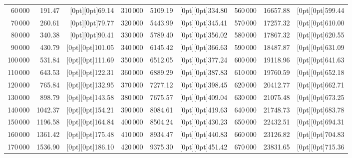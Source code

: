 {{\begin{tabular}{|r|r|r||r|r|r||r|r|r|}
\cline{1-2}\cline{4-5}\cline{7-8}
60\,000 & 191.47 & \raisebox{-6.7pt}[0pt][0pt]{69.14} & 310\,000 & 5109.19 & \raisebox{-6.7pt}[0pt][0pt]{334.80} & 560\,000 & 16657.88 & \raisebox{-6.7pt}[0pt][0pt]{599.44} \\
70\,000 & 260.61 & \raisebox{-6.7pt}[0pt][0pt]{79.77} & 320\,000 & 5443.99 & \raisebox{-6.7pt}[0pt][0pt]{345.41} & 570\,000 & 17257.32 & \raisebox{-6.7pt}[0pt][0pt]{610.00} \\
80\,000 & 340.38 & \raisebox{-6.7pt}[0pt][0pt]{90.41} & 330\,000 & 5789.40 & \raisebox{-6.7pt}[0pt][0pt]{356.02} & 580\,000 & 17867.32 & \raisebox{-6.7pt}[0pt][0pt]{620.55} \\
90\,000 & 430.79 & \raisebox{-6.7pt}[0pt][0pt]{101.05} & 340\,000 & 6145.42 & \raisebox{-6.7pt}[0pt][0pt]{366.63} & 590\,000 & 18487.87 & \raisebox{-6.7pt}[0pt][0pt]{631.09} \\
100\,000 & 531.84 & \raisebox{-6.7pt}[0pt][0pt]{111.69} & 350\,000 & 6512.05 & \raisebox{-6.7pt}[0pt][0pt]{377.24} & 600\,000 & 19118.96 & \raisebox{-6.7pt}[0pt][0pt]{641.63} \\
\cline{1-2}\cline{4-5}\cline{7-8}
110\,000 & 643.53 & \raisebox{-6.7pt}[0pt][0pt]{122.31} & 360\,000 & 6889.29 & \raisebox{-6.7pt}[0pt][0pt]{387.83} & 610\,000 & 19760.59 & \raisebox{-6.7pt}[0pt][0pt]{652.18} \\
120\,000 & 765.84 & \raisebox{-6.7pt}[0pt][0pt]{132.95} & 370\,000 & 7277.12 & \raisebox{-6.7pt}[0pt][0pt]{398.45} & 620\,000 & 20412.77 & \raisebox{-6.7pt}[0pt][0pt]{662.71} \\
130\,000 & 898.79 & \raisebox{-6.7pt}[0pt][0pt]{143.58} & 380\,000 & 7675.57 & \raisebox{-6.7pt}[0pt][0pt]{409.04} & 630\,000 & 21075.48 & \raisebox{-6.7pt}[0pt][0pt]{673.25} \\
140\,000 & 1042.37 & \raisebox{-6.7pt}[0pt][0pt]{154.21} & 390\,000 & 8084.61 & \raisebox{-6.7pt}[0pt][0pt]{419.63} & 640\,000 & 21748.73 & \raisebox{-6.7pt}[0pt][0pt]{683.78} \\
150\,000 & 1196.58 & \raisebox{-6.7pt}[0pt][0pt]{164.84} & 400\,000 & 8504.24 & \raisebox{-6.7pt}[0pt][0pt]{430.23} & 650\,000 & 22432.51 & \raisebox{-6.7pt}[0pt][0pt]{694.31} \\
\cline{1-2}\cline{4-5}\cline{7-8}
160\,000 & 1361.42 & \raisebox{-6.7pt}[0pt][0pt]{175.48} & 410\,000 & 8934.47 & \raisebox{-6.7pt}[0pt][0pt]{440.83} & 660\,000 & 23126.82 & \raisebox{-6.7pt}[0pt][0pt]{704.83} \\
170\,000 & 1536.90 & \raisebox{-6.7pt}[0pt][0pt]{186.10} & 420\,000 & 9375.30 & \raisebox{-6.7pt}[0pt][0pt]{451.42} & 670\,000 & 23831.65 & \raisebox{-6.7pt}[0pt][0pt]{715.36} \\

\end{tabular}}}
